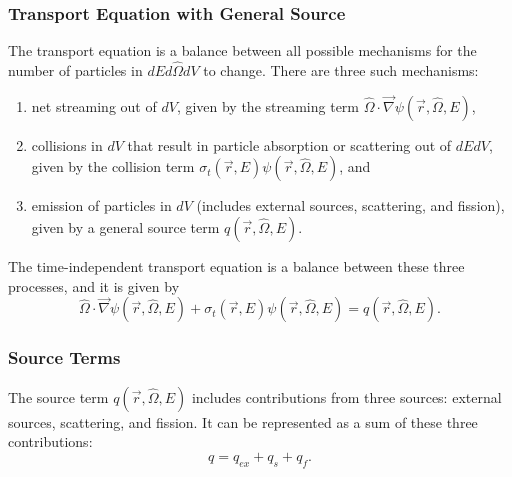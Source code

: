 \subsubsection{Transport Equation with General Source}
\label{sec:bg:rt:te:te}

The transport equation is a balance between all possible mechanisms for the number of particles in $dEd\hat{\Omega}dV$ to change.
There are three such mechanisms:
\begin{enumerate}
  \item net streaming out of $dV$, given by the streaming term $\hat{\Omega}\cdot\vec{\nabla}\psi\left(\vec{r},\hat{\Omega},E\right)$,
  \item collisions in $dV$ that result in particle absorption or scattering out of $dEdV$, given by the collision term $\sigma_t\left(\vec{r},E\right)\psi\left(\vec{r},\hat{\Omega},E\right)$, and
  \item emission of particles in $dV$ (includes external sources, scattering, and fission), given by a general source term $q\left(\vec{r},\hat{\Omega},E\right)$.
\end{enumerate}

The time-independent transport equation is a balance between these three processes, and it is given by
\begin{equation}\label{eq:bg:rt:transport_equation_total_source_term}
  \hat{\Omega}\cdot\vec{\nabla}\psi\left(\vec{r},\hat{\Omega},E\right) +
  \sigma_t\left(\vec{r},E\right)\psi\left(\vec{r},\hat{\Omega},E\right) =
  q\left(\vec{r},\hat{\Omega},E\right).
\end{equation}

\subsubsection{Source Terms}
\label{sec:bg:rt:te:st}

The source term $q\left(\vec{r},\hat{\Omega},E\right)$ includes contributions from three sources: external sources, scattering, and fission.
It can be represented as a sum of these three contributions:
\begin{equation}\label{eq:bg:rt:source_term_contributions}
  q = q_{ex} + q_s + q_f.
\end{equation}

